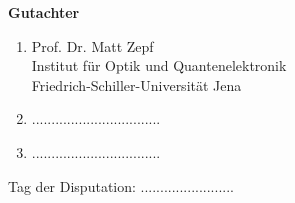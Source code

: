 \mbox{}
\vfill

\textbf{Gutachter}
\vspace{0.5cm}


\begin{enumerate}
    \item Prof. Dr. Matt Zepf\\
    Institut f{\"u}r Optik und Quantenelektronik\\
    Friedrich-Schiller-Universit{\"a}t Jena
    \vspace{1cm}
    \item .................................
    \vspace{1cm}
    \item .................................
    \vspace{1cm}
\end{enumerate}
\vspace{2cm}

Tag der Disputation: ........................